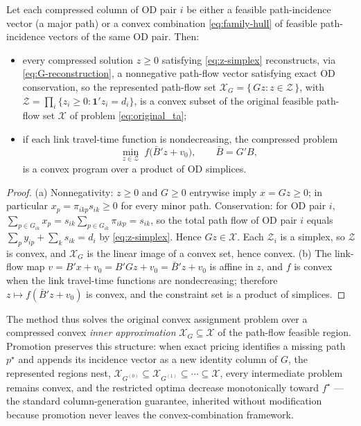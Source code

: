 \begin{proposition}
\label{prop:convexity-preservation}
Let each compressed column of OD pair $i$ be either a feasible path-incidence
vector (a major path) or a convex combination \eqref{eq:family-hull} of
feasible path-incidence vectors of the same OD pair. Then:
\begin{itemize}
\item[(a)] every compressed solution $z \ge 0$ satisfying
\eqref{eq:z-simplex} reconstructs, via \eqref{eq:G-reconstruction}, a
nonnegative path-flow vector satisfying exact OD conservation, so the
represented path-flow set $\mathcal X_G = \{\, Gz : z \in \mathcal Z \,\}$,
with $\mathcal Z = \prod_i \{ z_i \ge 0 : \mathbf 1' z_i = d_i \}$, is a
convex subset of the original feasible path-flow set $\mathcal X$ of problem
\eqref{eq:original_ta};
\item[(b)] if each link travel-time function is nondecreasing, the compressed
problem
\begin{equation}
\label{eq:compressed-fw}
\min_{z \in \mathcal Z} \; f\bigl(\bar B' z + v_0\bigr),
\qquad \bar B = G' B ,
\end{equation}
is a convex program over a product of OD simplices.
\end{itemize}
\end{proposition}

\begin{proof}
(a) Nonnegativity: $z \ge 0$ and $G \ge 0$ entrywise imply $x = Gz \ge 0$; in
particular $x_p = \pi_{ikp} s_{ik} \ge 0$ for every minor path. Conservation:
for OD pair $i$,
$\sum_{p \in G_{ik}} x_p = s_{ik} \sum_{p \in G_{ik}} \pi_{ikp} = s_{ik}$,
so the total path flow of OD pair $i$ equals
$\sum_{p} y_{ip} + \sum_k s_{ik} = d_i$ by \eqref{eq:z-simplex}. Hence $Gz \in
\mathcal X$. Each $\mathcal Z_i$ is a simplex, so $\mathcal Z$ is convex, and
$\mathcal X_G$ is the linear image of a convex set, hence convex.
(b) The link-flow map $v = B'x + v_0 = B'Gz + v_0 = \bar B' z + v_0$ is affine
in $z$, and $f$ is convex when the link travel-time functions are
nondecreasing; therefore $z \mapsto f(\bar B' z + v_0)$ is convex, and the
constraint set is a product of simplices.
\end{proof}

The method thus solves the original convex assignment problem over a
compressed convex \emph{inner approximation} $\mathcal X_G \subseteq \mathcal
X$ of the path-flow feasible region. Promotion preserves this structure:
when exact pricing identifies a missing path $p^\star$ and appends its
incidence vector as a new identity column of $G$, the represented regions
nest, $\mathcal X_{G^{(0)}} \subseteq \mathcal X_{G^{(1)}} \subseteq \cdots
\subseteq \mathcal X$, every intermediate problem remains convex, and the
restricted optima decrease monotonically toward $f^\star$ --- the standard
column-generation guarantee, inherited without modification because
promotion never leaves the convex-combination framework.

